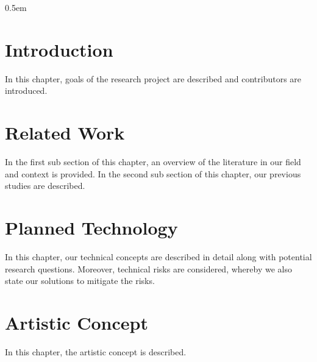 \documentclass[11pt,a4paper,titlepage,final,table]{article}
\begin{document}
\maketitle
\clearpage
{}
\setcounter{page}{2}
\pagestyle{plain}
\parskip 0.5em





{}

\lstset{
	basicstyle=\ttfamily\small,
	keywordstyle=\bfseries,
	language=[Sharp]C
}



\section{Introduction}
In this chapter, goals of the research project are described and contributors are introduced.



\section{Related Work}
In the first sub section of this chapter, an overview of the literature in our field and context is provided.
In the second sub section of this chapter, our previous studies are described.



\section{Planned Technology}
In this chapter, our technical concepts are described in detail along with potential research questions.
Moreover, technical risks are considered, whereby we also state our solutions to mitigate the risks.






\section{Artistic Concept}
In this chapter, the artistic concept is described.

\end{document}
